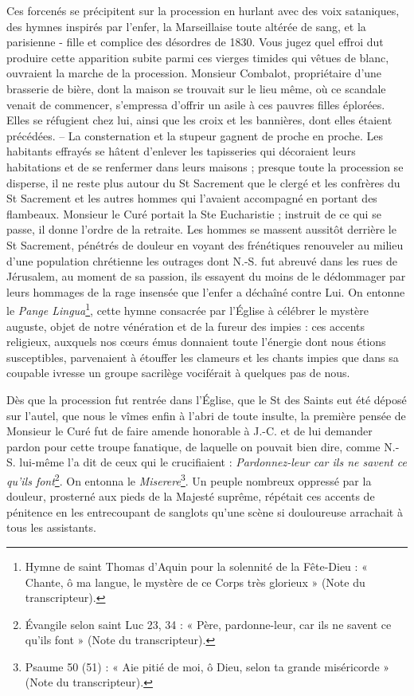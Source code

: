 \documentclass[11pt,a4paper]{report}
\begin{document}
Ces forcenés se précipitent sur la procession en hurlant avec des voix sataniques, des hymnes inspirés par l'enfer, la Marseillaise toute altérée de sang, et la parisienne - fille et complice des désordres de 1830. Vous jugez quel effroi dut produire cette apparition subite parmi ces vierges timides qui vêtues de blanc, ouvraient la marche de la procession. Monsieur Combalot, propriétaire d'une brasserie de bière, dont la maison se trouvait sur le lieu même, où ce scandale venait de commencer, s'empressa d'offrir un asile à ces pauvres filles éplorées. Elles se réfugient chez lui, ainsi que les croix et les bannières, dont elles étaient précédées. -- La consternation et la stupeur gagnent de proche en proche. Les habitants effrayés se hâtent d'enlever les tapisseries qui décoraient leurs habitations et de se renfermer dans leurs maisons ; presque toute la procession se disperse, il ne reste plus autour du St Sacrement que le clergé et les confrères du St Sacrement et les autres hommes qui l'avaient accompagné en portant des flambeaux. Monsieur le Curé portait la Ste Eucharistie ; instruit de ce qui se passe, il donne l'ordre de la retraite. Les hommes se massent aussitôt derrière le St Sacrement, pénétrés de douleur en voyant des frénétiques renouveler au milieu d'une population chrétienne les outrages dont N.-S. fut abreuvé dans les rues de Jérusalem, au moment de sa passion, ils essayent du moins de le dédommager par leurs hommages de la rage insensée que l'enfer a déchaîné contre Lui. On entonne le \textit{Pange Lingua}\footnote{Hymne de saint Thomas d'Aquin pour la solennité de la Fête-Dieu : « Chante, ô ma langue, le mystère de ce Corps très glorieux » (Note du transcripteur).}, cette hymne consacrée par l'Église à célébrer le mystère auguste, objet de notre vénération et de la fureur des impies : ces accents religieux, auxquels nos cœurs émus donnaient toute l'énergie dont nous étions susceptibles, parvenaient à étouffer les clameurs et les chants impies que dans sa coupable ivresse un groupe sacrilège vociférait à quelques pas de nous.

Dès que la procession fut rentrée dans l'Église, que le St des Saints eut été déposé sur l'autel, que nous le vîmes enfin à l'abri de toute insulte, la première pensée de Monsieur le Curé fut de faire amende honorable à J.-C. et de lui demander pardon pour cette troupe fanatique, de laquelle on pouvait bien dire, comme N.-S. lui-même l'a dit de ceux qui le crucifiaient : \textit{Pardonnez-leur car ils ne savent ce qu'ils font}\footnote{Évangile selon saint Luc 23, 34 : « Père, pardonne-leur, car ils ne savent ce qu'ils font » (Note du transcripteur).}. On entonna le \textit{Miserere}\footnote{Psaume 50 (51) : « Aie pitié de moi, ô Dieu, selon ta grande miséricorde » (Note du transcripteur).}. Un peuple nombreux oppressé par la douleur, prosterné aux pieds de la Majesté suprême, répétait ces accents de pénitence en les entrecoupant de sanglots qu'une scène si douloureuse arrachait à tous les assistants.
\end{document}
